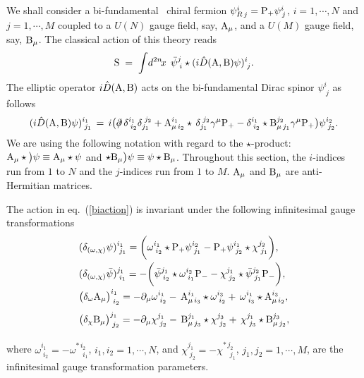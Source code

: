 \documentclass[a4paper,12pt]{article}
\def\A{{\rm A}}
\def\B{{\rm B}}
\def\prslash{{\partial\mkern-9mu/}}
\def\prslash{{\partial\mkern-9mu/}}    %
\def\idxn{\int\! d^{2n}\!x \,}
\begin{document}
We shall consider  a bi-fundamental~\cite{Terashima:2000xq} chiral fermion
$\psi^{i}_{R\,j}={\rm P}_{+}\psi^{i}_{\,j}$, $i=1,\cdots, N$ and $j=1,\cdots, M$  coupled  to a $U(N)$ gauge field, say,  $\A_{\mu}$, 
and a $U(M)$ gauge field, say, $\B_{\mu}$. The classical action of this
theory reads
\begin{equation}
{\rm S}\;=\;\idxn\; \bar{\psi}^{j}_{\;i}
\star(i\hat{D}(\A,\B)\psi)^{i}_{\;j}.
\label{biaction}
\end{equation}
The elliptic operator $i\hat{D}(\A,\B)$ acts on the bi-fundamental 
Dirac spinor $\psi^{i}_{\;j}$ as follows
\begin{displaymath}
(i\hat{D}(\A,\B)\psi)^{i_1}_{\; j_1}\,=\,i\big(
\prslash\,\delta^{i_1}_{\; i_2}\delta_{j_1}^{\; j_2}
+ \A^{i_1}_{\mu\,i_2}\star\,\delta_{j_1}^{\; j_2}\gamma^{\mu}{\rm P}_{+}
- \delta^{i_1}_{\; i_2} \star\B_{\mu\,j_1}^{j_2}\gamma^{\mu}{\rm P}_{+}\big)
\psi^{i_2}_{\; j_2}.
\end{displaymath}
We are using the following notation with regard to the $\star$-product: 
$\A_{\mu}\star\big)\psi\equiv \A_{\mu}\star\psi$ and 
$\star \B_{\mu}\big)\psi\equiv \psi \star \B_{\mu} $. Throughout this section, 
the $i$-indices run from $1$ to $N$ and the $j$-indices run from $1$ to $M$. 
$\A_{\mu}$ and $\B_{\mu}$ are anti-Hermitian matrices.  




The action in eq.~(\ref{biaction}) is invariant under the following 
infinitesimal gauge  transformations
\begin{equation}
\begin{array}{l}
{(\delta_{(\omega,\chi)} \psi)^{i_1}_{\;j_1}=
\bigg(\omega^{i_1}_{\;i_2}\star {\rm P}_{+}\psi^{i_2}_{\;j_1}
-{\rm P}_{+}\psi^{i_1}_{\;j_2}\star\chi^{j_2}_{\;j_1}\bigg),}\\[9pt]
{(\delta_{(\omega,\chi)} \bar{\psi})^{j_1}_{\;i_1}=
-\bigg(\bar{\psi}^{j_1}_{\;i_2}\star\omega^{i_2}_{\;i_1}{\rm P}_{-} 
-\chi^{j_1}_{\;j_2}\star\bar{\psi}^{j_2}_{\;j_1}{\rm P}_{-}\bigg),}\\[9pt]
{\big(\delta_{\omega} \A_{\mu}\big)^{i_1}_{\;i_2} = 
-\partial_{\mu}\omega^{i_1}_{\;i_2}-\,\A^{i_1}_{\mu\,i_3}\star
\omega^{i_3}_{\;i_2}+
\,\omega^{i_1}_{\;i_3}\star\A^{i_3}_{\mu\,i_2},}\\[9pt]
{\big(\delta_{\chi} {\B}_{\mu}\big)^{j_1}_{\;j_2} =- 
\partial_{\mu}\chi^{j_1}_{\;j_2}-
\,{\B}^{j_1}_{\mu\,j_3}\star\chi^{j_3}_{\;j_2}+
\,\chi^{j_1}_{\;j_3}\star{\B}^{j_3}_{\mu\,j_2},}\\[9pt]
\end{array}
\label{bitrans}
\end{equation}
where 
$\omega^{i_1}_{\;i_2}=-\omega^{*\,i_2}_{\quad i_1}$, $i_1 , i_2=1,\cdots,N$, 
and $\chi^{j_1}_{\;j_2}=-\chi^{*\,j_2}_{\quad j_1}$, $j_1, j_2 =1,\cdots,M$, 
are the infinitesimal gauge transformation parameters.
\end{document}
